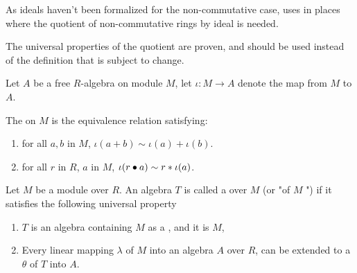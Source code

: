 \begin{remark}
    \label{mk:RingQuot}

    As ideals haven't been formalized for the non-commutative case, \Mathlib uses  in places
    where the quotient of non-commutative rings by ideal is needed.

    The universal properties of the quotient are proven, and should be used instead of the definition that is subject to change.
    
\end{remark}

\begin{definition}
    \label{TensorAlgebra_Rel}
    \leanok

    Let $A$ be a free $R$-algebra on module $M$, let $\iota : M \to A$ denote the map from $M$ to $A$.

    The  on $M$ is the equivalence relation satisfying:

    \begin{enumerate}

    \item for all $a, b$ in $M$, $\iota(a + b) \sim \iota(a) + \iota(b)$.
    \item for all $r$ in $R$, $a$ in $M$, $\iota(r \bullet a) \sim r * \iota(a)$.
    
    \end{enumerate}

\end{definition}

\begin{definition}
    \label{TensorAlgebra}

    Let $M$ be a module over $R$. An algebra $T$ is called a  over $M$ (or "of $M$ ")
    if it satisfies the following universal property

    \begin{enumerate}
    \item $T$ is an algebra containing $M$ as a , and it is  $M$,
    \item Every linear mapping $\lambda$ of $M$ into an algebra $A$ over $R$, can be extended to 
    a  $\theta$ of $T$ into $A$.
    \end{enumerate}

\end{definition}

